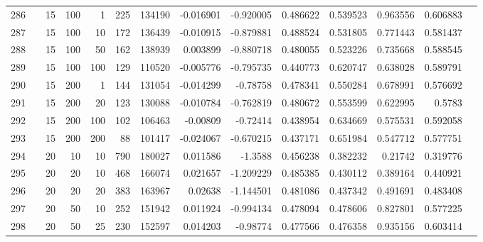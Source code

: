 \begin{longtable}{llrrrrrrrrrrrr}
		286 & &           15 &               100 &            1 &         225 &     134190 & -0.016901 & -0.920005 &  0.486622 &    0.539523 &       0.963556 &  0.606883 \\
		287 & &           15 &               100 &           10 &         172 &     136439 & -0.010915 & -0.879881 &  0.488524 &    0.531805 &       0.771443 &  0.581437 \\
		288 & &           15 &               100 &           50 &         162 &     138939 &  0.003899 & -0.880718 &  0.480055 &    0.523226 &       0.735668 &  0.588545 \\
		289 & &           15 &               100 &          100 &         129 &     110520 & -0.005776 & -0.795735 &  0.440773 &    0.620747 &       0.638028 &  0.589791 \\
		290 & &           15 &               200 &            1 &         144 &     131054 & -0.014299 &  -0.78758 &  0.478341 &    0.550284 &       0.678991 &  0.576692 \\
		291 & &           15 &               200 &           20 &         123 &     130088 & -0.010784 & -0.762819 &  0.480672 &    0.553599 &       0.622995 &    0.5783 \\
		292 & &           15 &               200 &          100 &         102 &     106463 &  -0.00809 &  -0.72414 &  0.438954 &    0.634669 &       0.575531 &  0.592058 \\
		293 & &           15 &               200 &          200 &          88 &     101417 & -0.024067 & -0.670215 &  0.437171 &    0.651984 &       0.547712 &  0.577751 \\
		294 & &           20 &                10 &           10 &         790 &     180027 &  0.011586 &   -1.3588 &  0.456238 &    0.382232 &        0.21742 &  0.319776 \\
		295 & &           20 &                20 &           10 &         468 &     166074 &  0.021657 & -1.209229 &  0.485385 &    0.430112 &       0.389164 &  0.440921 \\
		296 & &           20 &                20 &           20 &         383 &     163967 &   0.02638 & -1.144501 &  0.481086 &    0.437342 &       0.491691 &  0.483408 \\
		297 & &           20 &                50 &           10 &         252 &     151942 &  0.011924 & -0.994134 &  0.478094 &    0.478606 &       0.827801 &  0.577225 \\
		298 & &           20 &                50 &           25 &         230 &     152597 &  0.014203 &  -0.98774 &  0.477566 &    0.476358 &       0.935156 &  0.603414 \\

\end{longtable}
